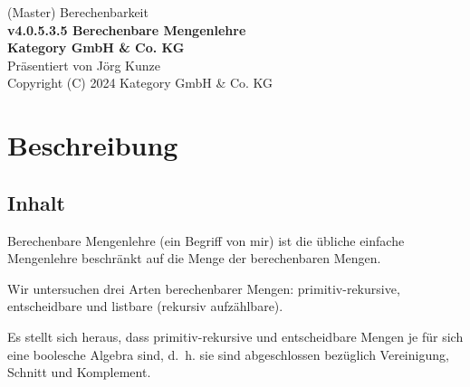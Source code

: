 \documentclass[a4paper]{amsart}
\theoremstyle{definition}
\begin{document}
\begin{titlepage}
\centering
{\huge
(Master) Berechenbarkeit\\[1cm]
\textbf{v4.0.5.3.5 Berechenbare Mengenlehre}
}\\[1cm]

\textbf{Kategory GmbH \& Co. KG}\\
Präsentiert von Jörg Kunze\\
Copyright (C) 2024 Kategory GmbH \& Co. KG

\end{titlepage}

%

\newpage

\section*{Beschreibung}

\subsection*{Inhalt}
Berechenbare Mengenlehre (ein Begriff von mir) ist die übliche einfache Mengenlehre beschränkt auf die Menge der berechenbaren Mengen.

Wir untersuchen drei Arten berechenbarer Mengen: primitiv-rekursive, entscheidbare und listbare (rekursiv aufzählbare).

Es stellt sich heraus, dass primitiv-rekursive und entscheidbare Mengen je für sich eine boolesche Algebra sind, d.~h. sie sind abgeschlossen bezüglich Vereinigung, Schnitt und Komplement.
\end{document}
